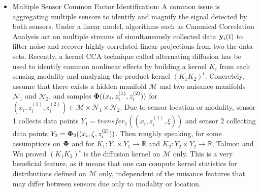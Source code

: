 \begin{itemize}
\item Multiple Sensor Common Factor Identification: A common issue is aggregating multiple sensors to identify and magnify the signal detected by both sensors.  Under a linear model, algorithms such as Canonical Correlation Analysis \cite{hardoon2004canonical} act on multiple streams of simultaneously collected data $\mathbf{y}_i(t)$ to filter noise and recover highly correlated linear projections from two the data sets.
Recently, a kernel CCA technique called alternating diffusion \cite{lederman2018learning} has be used to identify common nonlinear effects by building a kernel $K_i$ from each sensing modality and analyzing the product kernel $(K_1 K_2)^t$.   Concretely, assume that there exists a hidden manifold $\mathcal{M}$ and two nuisance manifolds $\mathcal{N}_1$ and $\mathcal{N}_2$, and samples $\mathbf{\Phi}((x_i,z_i^{(1)}, z_i^{(2)}))$ for $(x_i,z_i^{(1)}, z_i^{(2)})\in \mathcal{M}\times \mathcal{N}_1\times \mathcal{N}_2$.  Due to sensor location or modality, sensor 1 collects data points $Y_1 = transfer_1((x_i,z_i^{(1)}, \xi))$ and sensor 2 collecting data points $Y_2 = \mathbf{\Phi}_2((x_i,\zeta,z_i^{(2)}))$.  Then roughly speaking, for some assumptions on $\mathbf{\Phi}$ and for $K_1: Y_1\times Y_1 \rightarrow \mathbb{R}$ and $K_2:Y_2\times Y_2 \rightarrow \mathbb{R}$, Talmon and Wu \cite{talmon2018latent} proved $(K_1 K_2)^t$ is the diffusion kernel on $\mathcal{M}$ only.   This is a very beneficial feature, as it means that one can compute kernel statistics for distributions defined on $\mathcal{M}$ only, independent of the nuisance features that may differ between sensors due only to modality or location.



\end{itemize}
